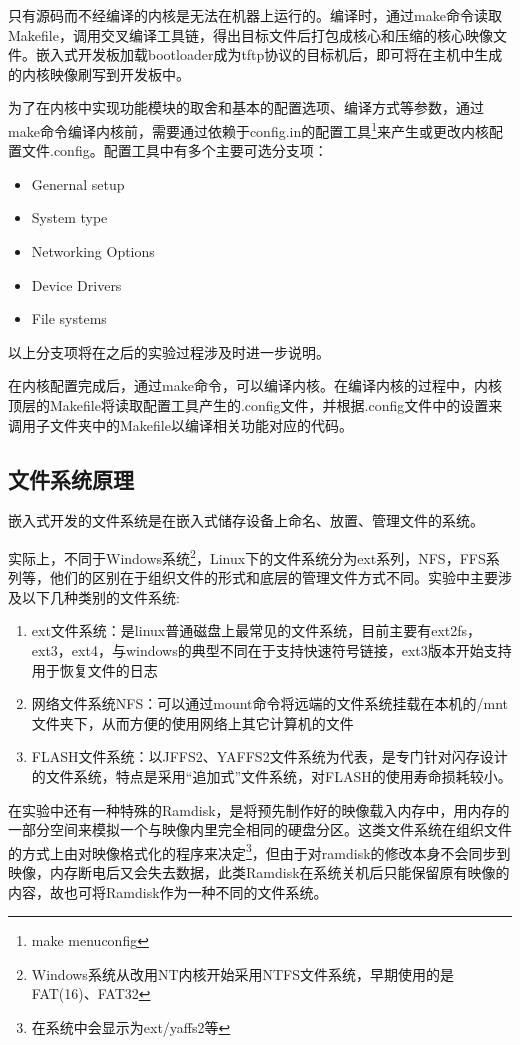\documentclass[hyperref,UTF8]{ctexart}
\begin{document}
只有源码而不经编译的内核是无法在机器上运行的。编译时，通过make命令读取Makefile，调用交叉编译工具链，得出目标文件后打包成核心和压缩的核心映像文件。嵌入式开发板加载bootloader成为tftp协议的目标机后，即可将在主机中生成的内核映像刷写到开发板中。

为了在内核中实现功能模块的取舍和基本的配置选项、编译方式等参数，通过make命令编译内核前，需要通过依赖于config.in的配置工具\footnote{make menuconfig}来产生或更改内核配置文件.config。配置工具中有多个主要可选分支项：
\begin{itemize}
    \item Genernal setup
    \item System type
    \item Networking Options
    \item Device Drivers
    \item File systems
\end{itemize}
以上分支项将在之后的实验过程涉及时进一步说明。

在内核配置完成后，通过make命令，可以编译内核。在编译内核的过程中，内核顶层的Makefile将读取配置工具产生的.config文件，并根据.config文件中的设置来调用子文件夹中的Makefile以编译相关功能对应的代码。

\subsection{文件系统原理}\label{subsec:fs-prin}
嵌入式开发的文件系统是在嵌入式储存设备上命名、放置、管理文件的系统。

实际上，不同于Windows系统\footnote{Windows系统从改用NT内核开始采用NTFS文件系统，早期使用的是FAT(16)、FAT32}，Linux下的文件系统分为ext系列，NFS，FFS系列等，他们的区别在于组织文件的形式和底层的管理文件方式不同。实验中主要涉及以下几种类别的文件系统:
\begin{enumerate}
    \item ext文件系统：是linux普通磁盘上最常见的文件系统，目前主要有ext2fs，ext3，ext4，与windows的典型不同在于支持快速符号链接，ext3版本开始支持用于恢复文件的日志\label{item:intro-ext}
    \item 网络文件系统NFS：可以通过mount命令将远端的文件系统挂载在本机的/mnt文件夹下，从而方便的使用网络上其它计算机的文件
    \item FLASH文件系统：以JFFS2、YAFFS2文件系统为代表，是专门针对闪存设计的文件系统，特点是采用“追加式”文件系统，对FLASH的使用寿命损耗较小。\label{item:intro-flash}
\end{enumerate}

在实验中还有一种特殊的Ramdisk，是将预先制作好的映像载入内存中，用内存的一部分空间来模拟一个与映像内里完全相同的硬盘分区。这类文件系统在组织文件的方式上由对映像格式化的程序来决定\footnote{在系统中会显示为ext/yaffs2等}，但由于对ramdisk的修改本身不会同步到映像，内存断电后又会失去数据，此类Ramdisk在系统关机后只能保留原有映像的内容，故也可将Ramdisk作为一种不同的文件系统。
\end{document}
